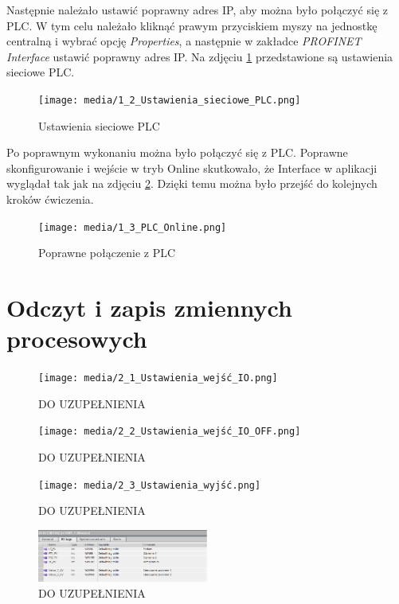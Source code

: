 \documentclass{article}
\begin{document}
Następnie należało ustawić poprawny adres IP, aby można było połączyć się z PLC. W tym celu należało kliknąć prawym przyciskiem myszy na jednostkę centralną i wybrać opcję \textit{Properties}, a następnie w zakładce \textit{PROFINET Interface} ustawić poprawny adres IP. Na zdjęciu \ref{fig:zdj2} przedstawione są ustawienia sieciowe PLC.
\begin{figure}[H]
    \centering
    \texttt{[image: media/1\_2\_Ustawienia\_sieciowe\_PLC.png]}
    \caption{Ustawienia sieciowe PLC}
    \label{fig:zdj2}
\end{figure}

Po poprawnym wykonaniu można było połączyć się z PLC. Poprawne skonfigurowanie i wejście w tryb Online skutkowało, że Interface w aplikacji wyglądał tak jak na zdjęciu \ref{fig:zdj3}. Dzięki temu można było przejść do kolejnych kroków ćwiczenia.
\begin{figure}[H]
    \centering
    \texttt{[image: media/1\_3\_PLC\_Online.png]}
    \caption{Poprawne połączenie z PLC}
    \label{fig:zdj3}
\end{figure}


\newpage
\section{Odczyt i zapis zmiennych procesowych}

\begin{figure}[H]
    \centering
    \texttt{[image: media/2\_1\_Ustawienia\_wejść\_IO.png]}
    \caption{DO UZUPEŁNIENIA}
    \label{fig:zdj4}
\end{figure}

\begin{figure}[H]
    \centering
    \texttt{[image: media/2\_2\_Ustawienia\_wejść\_IO\_OFF.png]}
    \caption{DO UZUPEŁNIENIA}
    \label{fig:zdj5}
\end{figure}

\begin{figure}[H]
    \centering
    \texttt{[image: media/2\_3\_Ustawienia\_wyjść.png]}
    \caption{DO UZUPEŁNIENIA}
    \label{fig:zdj6}
\end{figure}

\begin{figure}[H]
    \centering
    \includegraphics[width=0.5\textwidth]{media/2_4_Tagi_moduł_1.png}
    \caption{DO UZUPEŁNIENIA}
    \label{fig:zdj7}
\end{figure}
\end{document}
